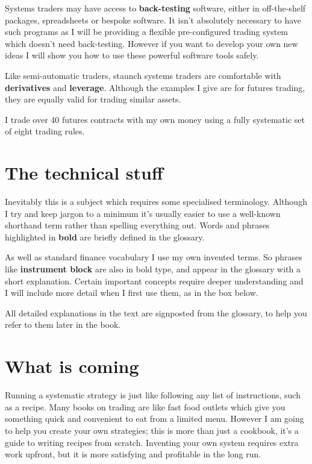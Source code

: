 Systems traders may have access to \textbf{back-testing} software, either in off-the-shelf packages, spreadsheets or bespoke software. It isn't absolutely necessary to have such programs as I will be providing a flexible pre-configured trading system which doesn't need back-testing. However if you want to develop your own new ideas I will show you how to use these powerful software tools safely.

Like semi-automatic traders, staunch systems traders are comfortable with \textbf{derivatives} and \textbf{leverage}. Although the examples I give are for futures trading, they are equally valid for trading similar assets.

I trade over 40 futures contracts with my own money using a fully systematic set of eight trading rules.

\section*{The technical stuff}  {}

Inevitably this is a subject which requires some specialised terminology. Although I try and keep jargon to a minimum it's usually easier to use a well-known shorthand term rather than spelling everything out. Words and phrases highlighted in \textbf{bold} are briefly defined in the glossary.

As well as standard finance vocabulary I use my own invented terms. So phrases like \textbf{instrument block} are also in bold type, and appear in the glossary with a short explanation. Certain important concepts require deeper understanding and I will include more detail when I first use them, as in the box below.

All detailed explanations in the text are signposted from the glossary, to help you refer to them later in the book.


\section*{What is coming}  {}

Running a systematic strategy is just like following any list of instructions, such as a recipe. Many books on trading are like fast food outlets which give you something quick and convenient to eat from a limited menu. However I am going to help you create your own strategies; this is more than just a cookbook, it's a guide to writing recipes from scratch. Inventing your own system requires extra work upfront, but it is more satisfying and profitable in the long run.

